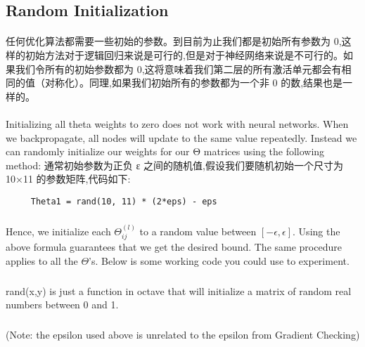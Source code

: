 \documentclass{article}
\begin{document}
\begin{CJK}{UTF8}{gbsn}
\subsection{Random Initialization}
\paragraph{ }
\begin{figure}[H]
\label{fig:550}
\end{figure}
任何优化算法都需要一些初始的参数。到目前为止我们都是初始所有参数为 0,这样的初始方法对于逻辑回归来说是可行的,但是对于神经网络来说是不可行的。如果我们令所有的初始参数都为 0,这将意味着我们第二层的所有激活单元都会有相同的值（对称化）。同理,如果我们初始所有的参数都为一个非 0 的数,结果也是一样的。
\begin{figure}[H]
\label{fig:552}
\end{figure}
\paragraph{}
Initializing all theta weights to zero does not work with neural networks. When we backpropagate, all nodes will update to the same value repeatedly. Instead we can randomly initialize our weights for our Θ matrices using the following method:
通常初始参数为正负 ε 之间的随机值,假设我们要随机初始一个尺寸为 10×11 的参数矩阵,代码如下:
    \begin{verbatim}
     Theta1 = rand(10, 11) * (2*eps) - eps
    \end{verbatim}
\subparagraph{}
Hence, we initialize each $\Theta_{ij}^{(l)}$ to a random value between $[-\epsilon,\epsilon]$. Using the above formula guarantees that we get the desired bound. The same procedure applies to all the $\Theta$'s. Below is some working code you could use to experiment.
\begin{figure}[H]
\label{fig:559}
\end{figure}
\subparagraph{}
rand(x,y) is just a function in octave that will initialize a matrix of random real numbers between 0 and 1.
\subparagraph{}
(Note: the epsilon used above is unrelated to the epsilon from Gradient Checking)
\begin{figure}[H]
\label{fig:553}
\end{figure}
\begin{figure}[H]
\label{fig:556}
\end{figure}

\end{CJK}
\end{document}

